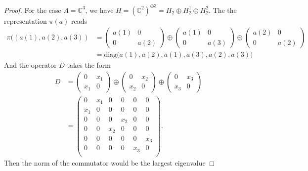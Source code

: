 \begin{proof}
    For the case $A=\mathbb{C}^3$, we have $H = (\mathbb{C}^2)^{\oplus 3} = H_2
    \oplus H_2^1 \oplus H_2^2$. The the representation $\pi (a)$ reads
    \begin{align}
        \pi((a(1), a(2), a(3)) &=
        \begin{pmatrix}
            a(1) & 0 \\ 0 & a(2)
        \end{pmatrix} \oplus
        \begin{pmatrix}
            a(1) & 0 \\ 0 & a(3)
        \end{pmatrix} \oplus
        \begin{pmatrix}
            a(2) & 0 \\ 0 & a(2)
        \end{pmatrix} \nonumber  \\
                               & = \text{diag}\big(a(1), a(2), a(1), a(3), a(2),
                               a(3)\big)
    \end{align}
    And the operator $D$ takes the form
    \begin{align}
        D &=
        \begin{pmatrix}
            0 & x_1 \\ x_1 & 0
        \end{pmatrix} \oplus
        \begin{pmatrix}
            0 & x_2 \\ x_2 & 0
        \end{pmatrix} \oplus
        \begin{pmatrix}
            0 & x_3 \\ x_3 & 0
        \end{pmatrix} \nonumber \\
        &=
        \begin{pmatrix}
            0   & x_1 & 0 & 0 & 0 & 0 \\
            x_1 & 0   & 0 & 0 & 0 & 0 \\
            0   & 0   & 0 & x_2 & 0 & 0 \\
            0   & 0   & x_2 & 0 & 0 & 0 \\
            0   & 0   & 0 & 0 & 0 & x_3 \\
            0   & 0   & 0 & 0 & x_3 & 0 \\
        \end{pmatrix}.
    \end{align}
    Then the norm of the commutator would be the largest eigenvalue

\end{proof}

